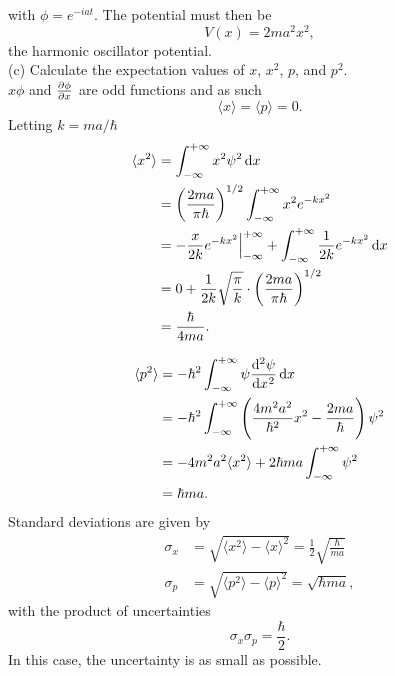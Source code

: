 \begin{wex}
\begin{subequations}
\end{subequations}
with $\phi=e^{-iat}$. 
The potential must then be
\begin{equation}
V(x)=2ma^2x^2, 
\end{equation}
the harmonic oscillator potential.\\
(c) Calculate the expectation values of $x$, $x^2$, $p$, and $p^2$.\\
$x\phi$ and $\diffp{\phi}{x}$ are odd functions and as such 
\begin{equation}
\langle x\rangle=\langle p\rangle=0.
\end{equation}
Letting $k=ma/\hbar$
\begin{subequations}
\begin{align}
\langle x^2\rangle&=\intinf x^2\psi^2\dx\\
&=\left(\frac{2ma}{\pi\hbar} \right)^{1/2}\intinf x^2e^{-kx^2}\\
&=-\frac{x}{2k}e^{-kx^2}\Big|^{+\inf}_{-\inf}+\intinf\frac{1}{2k}e^{-kx^2}\dx\\
&=0+\frac{1}{2k}\sqrt{\frac{\pi}{k}}\cdot\left(\frac{2ma}{\pi\hbar} \right)^{1/2}\\
&=\frac{\hbar}{4ma}. 
\end{align}
\end{subequations}

\begin{subequations}
\begin{align}
\langle p^2\rangle&=-\hbar^2\intinf\psi\diff[2]{\psi}{x}\dx\\
&=-\hbar^2\intinf \left(\frac{4m^2a^2}{\hbar^2}x^2-\frac{2ma}{\hbar} \right)\psi^2\\
&=-4m^2a^2\langle x^2\rangle+2\hbar ma\intinf\psi^2\\
&=\hbar ma.
\end{align}
\end{subequations}
Standard deviations are given by
\begin{subequations}
\begin{align}
\sigma_x&=\sqrt{\langle x^2\rangle-\langle x\rangle^2}=\frac{1}{2}\sqrt{\frac{\hbar}{ma}}\\
\sigma_p&=\sqrt{\langle p^2\rangle-\langle p\rangle^2}=\sqrt{\hbar ma}, 
\end{align}
\end{subequations}
with the product of uncertainties 
\begin{equation}
\sigma_x\sigma_p=\frac{\hbar}{2}. 
\end{equation}
In this case, the uncertainty is as small as possible. 
\end{wex}

